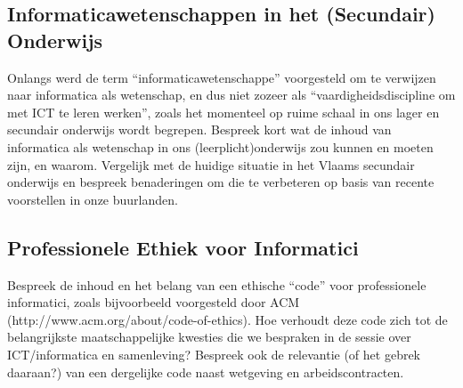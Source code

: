 \documentclass[../main.tex]{subfiles}
\begin{document}
\subsection{Informaticawetenschappen in het (Secundair) Onderwijs}
\begin{question}
Onlangs werd de term ``informaticawetenschappe'' voorgesteld om te verwijzen naar informatica als wetenschap, en dus niet zozeer als “vaardigheidsdiscipline om met ICT te leren werken”, zoals het momenteel op ruime schaal in ons lager en secundair onderwijs wordt begrepen.
Bespreek kort wat de inhoud van informatica als wetenschap in ons (leerplicht)onderwijs zou kunnen en moeten zijn, en waarom. Vergelijk met de huidige situatie in het Vlaams secundair onderwijs en bespreek benaderingen om die te verbeteren op basis van recente voorstellen in onze buurlanden.
\end{question}

\subsection{Professionele Ethiek voor Informatici}
\begin{question}
Bespreek de inhoud en het belang van een ethische ``code'' voor professionele informatici, zoals bijvoorbeeld voorgesteld door ACM (http://www.acm.org/about/code-of-ethics).
Hoe verhoudt deze code zich tot de belangrijkste maatschappelijke kwesties die we bespraken in de sessie over ICT/informatica en samenleving? Bespreek ook de relevantie (of het gebrek daaraan?) van een dergelijke code naast wetgeving en arbeidscontracten.
\end{question}
\end{document}
